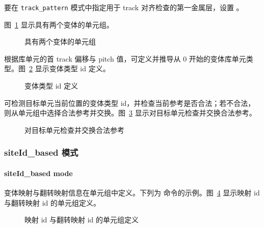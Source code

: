 要在 \texttt{track\_pattern} 模式中指定用于 track 对齐检查的第一金属层，设置 。

图~\ref{fig:fc-var-two} 显示具有两个变体的单元组。

\begin{figure}[htbp]
\centering
{}
\caption{具有两个变体的单元组}
\label{fig:fc-var-two}
\end{figure}

根据库单元的首 track 偏移与 pitch 值，可定义并推导从 0 开始的变体库单元类型。图~\ref{fig:fc-var-typeid} 显示变体类型 id 定义。

\begin{figure}[htbp]
\centering
{}
\caption{变体类型 id 定义}
\label{fig:fc-var-typeid}
\end{figure}

可检测目标单元当前位置的变体类型 id，并检查当前参考是否合法；若不合法，则从单元组中选择合法参考并交换。图~\ref{fig:fc-var-swap} 显示对目标单元检查并交换合法参考。

\begin{figure}[htbp]
\centering
{}
\caption{对目标单元检查并交换合法参考}
\label{fig:fc-var-swap}
\end{figure}

\subsubsection{siteId\_based 模式}
\paragraph*{siteId\_based mode}

变体映射与翻转映射信息在单元组中定义。下列为  命令的示例。图~\ref{fig:fc-var-mapid} 显示映射 id 与翻转映射 id 的单元组定义。

\begin{figure}[htbp]
\centering
{}
\caption{映射 id 与翻转映射 id 的单元组定义}
\label{fig:fc-var-mapid}
\end{figure}

